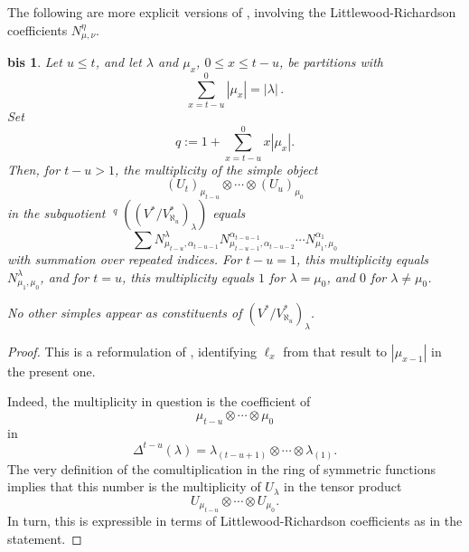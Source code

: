\documentclass[11pt]{article}
\theoremstyle{plain}
\theoremstyle{nonumberplain}
\newtheorem{qfbis}{\Cref{le.quot_filt} bis}
\theoremstyle{plain}
\theoremstyle{nonumberplain}
\newtheorem{proof}{Proof}
\newcommand\al{\aleph}
\DeclareMathOperator{\usoc}{\underline{\mathrm{soc}}}
\begin{document}
 








The following are more explicit versions of , involving the Littlewood-Richardson coefficients $N_{\mu,\nu}^\eta$.  




\begin{qfbis}
 Let $u\leq t$, and let $\lambda$ and $\mu_x$, $0\le x\le t-u$, be partitions with
\begin{equation*}
\sum^{0}_{x=t-u}|\mu_x|=|\lambda|\,.
\end{equation*}
Set
\begin{equation*}
q:=1+\sum^{0}_{x=t-u}x|\mu_x|.  
\end{equation*}
Then, for $t-u>1$, the multiplicity of the simple object
\begin{equation*}
(U_t)_{\mu_{t-u}}\otimes\cdots\otimes (U_u)_{\mu_0}
\end{equation*}
 in the subquotient $\usoc^q((V^*/V^*_{\al_u})_\lambda)$  equals
  \begin{equation*}
    \sum N_{\mu_{t-u},\alpha_{t-u-1}}^{\lambda} N_{\mu_{t-u-1},\alpha_{t-u-2}}^{\alpha_{t-u-1}}\cdots N_{\mu_1,\mu_0}^{\alpha_1}
  \end{equation*}
  with summation over repeated indices.  For $t-u=1$, this multiplicity equals $N^\lambda_{\mu_1, \mu_0}$, and for $t=u$, this multiplicity equals $1$ for $\lambda=\mu_0$, and $0$ for $\lambda\neq\mu_0$.



No other simples appear as constituents of $(V^*/V^*_{\al_u})_\lambda$. 
\end{qfbis}
\begin{proof}
  This is a reformulation of , identifying $\ell_x$
  from that result to $|\mu_{x-1}|$ in the present one.

  Indeed, the multiplicity in question is the coefficient of
  \begin{equation*}
    \mu_{t-u}\otimes\cdots\otimes \mu_{0} 
  \end{equation*}
  in
  \begin{equation*}
    \Delta^{t-u}(\lambda)=\lambda_{(t-u+1)}\otimes\cdots\otimes \lambda_{(1)}. 
  \end{equation*}
  The very definition of the comultiplication in the ring of symmetric
  functions implies that this number is the multiplicity of
  $U_\lambda$ in the tensor product
  \begin{equation*}
    U_{\mu_{t-u}}\otimes\cdots\otimes U_{\mu_{0}}.
  \end{equation*}
  In turn, this is expressible in terms of Littlewood-Richardson
  coefficients as in the statement.
\end{proof}
\end{document}
